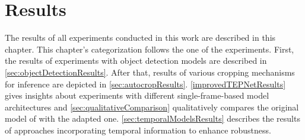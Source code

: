 \chapter{Results}
\label{sec:results}


The results of all experiments conducted in this work are described in this chapter.
This chapter's categorization follows the one of the experiments.
First, the results of experiments with object detection models are described in \autoref{sec:objectDetectionResults}.
After that, results of various cropping mechanisms for inference are depicted in \autoref{sec:autocropResults}.
\autoref{improvedTEPNetResults} gives insights about experiments with different single-frame-based model architectures and \autoref{sec:qualitativeComparison} qualitatively compares the original model of \cite{tepNet2024} with the adapted one.
\autoref{sec:temporalModelsResults} describes the results of approaches incorporating temporal information to enhance robustness.












